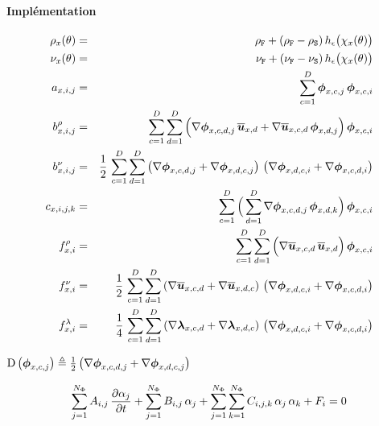 \documentclass[10pt,a4paper]{article}
\begin{document}
\paragraph{Implémentation}
\begin{eqnarray}
\rho_x(\theta) &=& \rho_{\mathtt{F}} + (\rho_{\mathtt{F}}-\rho_{\mathtt{S}})\,h_{\epsilon}\big(\chi_x(\theta)\big) \\
\nu_x(\theta) &=& \nu_{\mathtt{F}} + (\nu_{\mathtt{F}}-\nu_{\mathtt{S}})\,h_{\epsilon}\big(\chi_x(\theta)\big) \\
a_{x,i,j} &=& \sum_{c=1}^{D}\boldsymbol{\phi}_{x,c,j}\,\boldsymbol{\phi}_{x,c,i} \\
b_{x,i,j}^\rho &=& \sum_{c=1}^{D}\sum_{d=1}^{D} \Big( \nabla \boldsymbol{\phi}_{x, c, d, j}\,\overline{\boldsymbol{u}}_{x, d} + \nabla \overline{\boldsymbol{u}}_{x, c, d} \,\boldsymbol{\phi}_{x, d, j} \Big)\,\boldsymbol{\phi}_{x, c, i}\\ 
b_{x,i,j}^\nu &=& \frac{1}{2}\,\sum_{c=1}^D{\sum_{d=1}^D \left( \nabla\boldsymbol{\phi}_{x, c,d, j} + \nabla\boldsymbol{\phi}_{x, d, c, j} \right)\, \left( \nabla\boldsymbol{\phi}_{x, d,c, i} + \nabla\boldsymbol{\phi}_{x, c, d, i} \right)} \\
c_{x,i,j,k}&=& \sum_{c=1}^D \Big(\sum_{d=1}^D \nabla\boldsymbol{\phi}_{x, c,d,j}\,\boldsymbol{\phi}_{x,d,k}\Big)\, \boldsymbol{\phi}_{x,c,i}\\
f^\rho_{x, i}&=& \sum_{c=1}^D\sum_{d=1}^D\Big(\nabla \overline{\boldsymbol{u}}_{x, c,d}\,\overline{\boldsymbol{u}}_{x, d}\Big)\,\boldsymbol{\phi}_{x, c, i}\\
f^\nu_{x, i} &=& \frac{1}{2}\,\sum_{c=1}^D{\sum_{d=1}^D \left( \nabla\overline{\boldsymbol{u}}_{x, c,d} + \nabla\overline{\boldsymbol{u}}_{x, d, c} \right)\, \left( \nabla\boldsymbol{\phi}_{x, d,c, i} + \nabla\boldsymbol{\phi}_{x, c, d, i} \right)} \\
f^\lambda_{x,i}&= & \frac{1}{4}\,\sum_{c=1}^D{\sum_{d=1}^D \left( \nabla\boldsymbol{\lambda}_{x, c,d} + \nabla\boldsymbol{\lambda}_{x, d, c} \right)\, \left( \nabla\boldsymbol{\phi}_{x, d,c, i} + \nabla\boldsymbol{\phi}_{x, c, d, i} \right)}
\end{eqnarray}

$\operatorname{D}\left( \boldsymbol{\phi}_{x, c,j}\right) \triangleq \frac{1}{2} \left( \nabla\boldsymbol{\phi}_{x, c,d, j} + \nabla\boldsymbol{\phi}_{x, d, c, j} \right)$

\begin{equation}
\sum_{j=1}^{N_\Phi} A_{i,j}\,\frac{\partial \alpha_j}{\partial t}+\sum_{j=1}^{N_\Phi} B_{i,j}\,{\alpha_j}+\sum_{j=1}^{N_\Phi}\sum_{k=1}^{N_\Phi}  C_{i,j,k}\,\alpha_j\,\alpha_k + F_{i} = 0
\end{equation}
\end{document}
